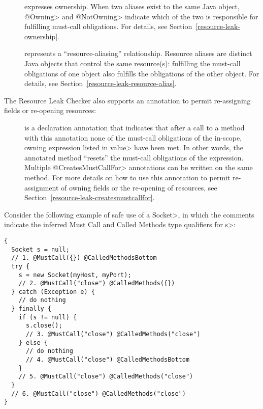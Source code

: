 \begin{description}

\item[]
\item[]
  expresses ownership.  When two aliases exist to the same Java object,
  \<@Owning> and \<@NotOwning> indicate which of the two is responsible for
  fulfilling must-call obligations.  For details, see
  Section~\ref{resource-leak-ownership}.

\item[]
  represents a ``resource-aliasing'' relationship.  Resource aliases are
  distinct Java objects that control the same resource(s):
  fulfilling the must-call obligations of one object also
  fulfills the obligations of the other object.  For details,
  see Section~\ref{resource-leak-resource-alias}.

\end{description}

The Resource Leak Checker also supports an annotation to permit re-assigning
fields or re-opening resources:

\begin{description}

\item[]
  is a declaration annotation that indicates that after a call to a method
  with this annotation none of the must-call obligations of the in-scope, owning expression
  listed in \<value> have been met.
  In other words, the annotated method ``resets'' the must-call obligations of the expression.
  Multiple \<@CreatesMustCallFor>
  annotations can be written on the same method.  For more details
  on how to use this annotation to permit re-assignment of owning
  fields or the re-opening of resources, see Section~\ref{resource-leak-createsmustcallfor}.

\end{description}



Consider the following example of safe use of a \<Socket>, in which the comments indicate the
inferred Must Call and Called Methods type qualifiers for \<s>:
\begin{verbatim}
{
  Socket s = null;
  // 1. @MustCall({}) @CalledMethodsBottom
  try {
    s = new Socket(myHost, myPort);
    // 2. @MustCall("close") @CalledMethods({})
  } catch (Exception e) {
    // do nothing
  } finally {
    if (s != null) {
      s.close();
      // 3. @MustCall("close") @CalledMethods("close")
    } else {
      // do nothing
      // 4. @MustCall("close") @CalledMethodsBottom
    }
    // 5. @MustCall("close") @CalledMethods("close")
  }
  // 6. @MustCall("close") @CalledMethods("close")
}
\end{verbatim}

